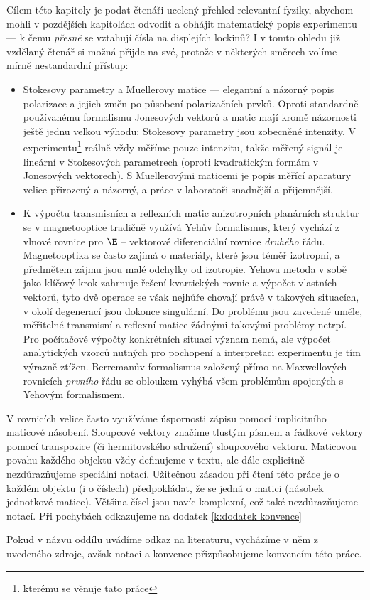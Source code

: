 Cílem této kapitoly je podat čtenáři ucelený přehled relevantní fyziky, abychom mohli v pozdějších kapitolách odvodit a obhájit matematický popis experimentu --- k čemu \emph{přesně} se vztahují čísla na displejích lockinů?
I v tomto ohledu již vzdělaný čtenář si možná přijde na své, protože v některých směrech volíme mírně nestandardní přístup:
\begin{itemize}
\item
Stokesovy parametry a Muellerovy matice --- elegantní a názorný popis polarizace a jejich změn po působení polarizačních prvků.
Oproti standardně používanému formalismu Jonesových vektorů a matic mají kromě názornosti ještě jednu velkou výhodu: Stokesovy parametry jsou zobecněné intenzity.
V experimentu\footnote{kterému se věnuje tato práce} reálně vždy měříme pouze intenzitu, takže měřený signál je lineární v Stokesových parametrech (oproti kvadratickým formám v Jonesových vektorech).
S Muellerovými maticemi je popis měřící aparatury velice přirozený a názorný, a práce v laboratoři snadnější a přijemnější.
\item
K výpočtu transmisních a reflexních matic anizotropních planárních struktur se v magnetooptice tradičně\cite{Berremanperturb} využívá Yehův formalismus\cite{Yeh}, který vychází z vlnové rovnice pro $\E$ -- vektorové diferenciální rovnice \emph{druhého} řádu.
Magnetooptika se často zajímá o materiály, které jsou téměř izotropní, a předmětem zájmu jsou malé odchylky od izotropie.
Yehova metoda v sobě jako klíčový krok zahrnuje řešení kvartických rovnic a výpočet vlastních vektorů, tyto dvě operace se však nejhůře chovají právě v takových situacích, v okolí degenerací jsou dokonce singulární\cite{Yehsing1}.
Do problému jsou zavedené uměle, měřitelné transmisní a reflexní matice žádnými takovými problémy netrpí.
Pro počítačové výpočty konkrétních situací význam nemá, ale výpočet analytických vzorců nutných pro pochopení a interpretaci experimentu je tím výrazně ztížen\cite{Vispolar}.
Berremanův formalismus založený přímo na Maxwellových rovnicích \emph{prvního} řádu se obloukem vyhýbá všem problémům spojených s Yehovým formalismem.
\end{itemize}

V rovnicích velice často využíváme úspornosti zápisu pomocí implicitního maticové násobení.
Sloupcové vektory značíme tlustým písmem a řádkové vektory pomocí transpozice (či hermitovského sdružení) sloupcového vektoru.
Maticovou povahu každého objektu vždy definujeme v textu, ale dále explicitně nezdůrazňujeme speciální notací.
Užitečnou zásadou při čtení této práce je o každém objektu (i o číslech) předpokládat, že se jedná o matici (násobek jednotkové matice).
Většina čísel jsou navíc komplexní, což také nezdůrazňujeme notací.
Při pochybách odkazujeme na dodatek \ref{k:dodatek konvence}

Pokud v názvu oddílu uvádíme odkaz na literaturu, vycházíme v něm z uvedeného zdroje, avšak notaci a konvence přizpůsobujeme konvencím této práce.

